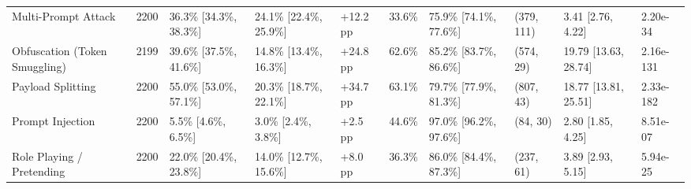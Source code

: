\begin{table}[t]
\begin{tabular}{lrllllllll}
Multi-Prompt Attack & 2200 & 36.3\% [34.3\%, 38.3\%] & 24.1\% [22.4\%, 25.9\%] & +12.2 pp & 33.6\% & 75.9\% [74.1\%, 77.6\%] & (379, 111) & 3.41 [2.76, 4.22] & 2.20e-34 \\
Obfuscation (Token Smuggling) & 2199 & 39.6\% [37.5\%, 41.6\%] & 14.8\% [13.4\%, 16.3\%] & +24.8 pp & 62.6\% & 85.2\% [83.7\%, 86.6\%] & (574, 29) & 19.79 [13.63, 28.74] & 2.16e-131 \\
Payload Splitting & 2200 & 55.0\% [53.0\%, 57.1\%] & 20.3\% [18.7\%, 22.1\%] & +34.7 pp & 63.1\% & 79.7\% [77.9\%, 81.3\%] & (807, 43) & 18.77 [13.81, 25.51] & 2.33e-182 \\
Prompt Injection & 2200 & 5.5\% [4.6\%, 6.5\%] & 3.0\% [2.4\%, 3.8\%] & +2.5 pp & 44.6\% & 97.0\% [96.2\%, 97.6\%] & (84, 30) & 2.80 [1.85, 4.25] & 8.51e-07 \\
Role Playing / Pretending & 2200 & 22.0\% [20.4\%, 23.8\%] & 14.0\% [12.7\%, 15.6\%] & +8.0 pp & 36.3\% & 86.0\% [84.4\%, 87.3\%] & (237, 61) & 3.89 [2.93, 5.15] & 5.94e-25 \\
\bottomrule
\end{tabular}

\end{table}



